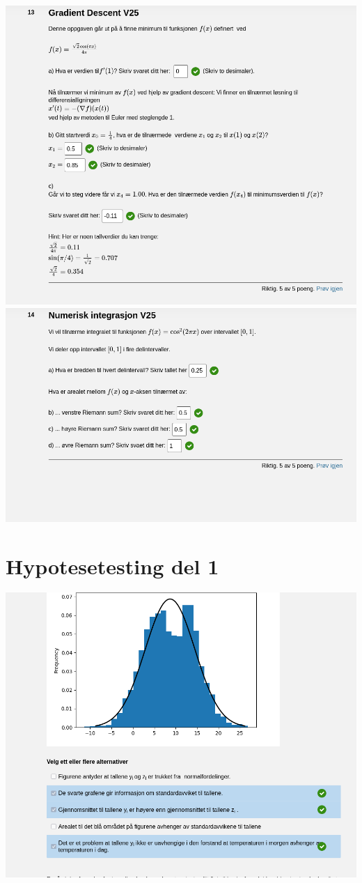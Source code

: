 \documentclass[12pt]{article}
\begin{document}
\includegraphics[width=\textwidth]{Screenshot_20250521_140154.png}
\newpage
\includegraphics[width=\textwidth]{Screenshot_20250521_140546.png}
\newpage
\section*{Hypotesetesting del 1}
\includegraphics[width=\textwidth]{Screenshot_20250521_140919.png}
\newpage
\end{document}
